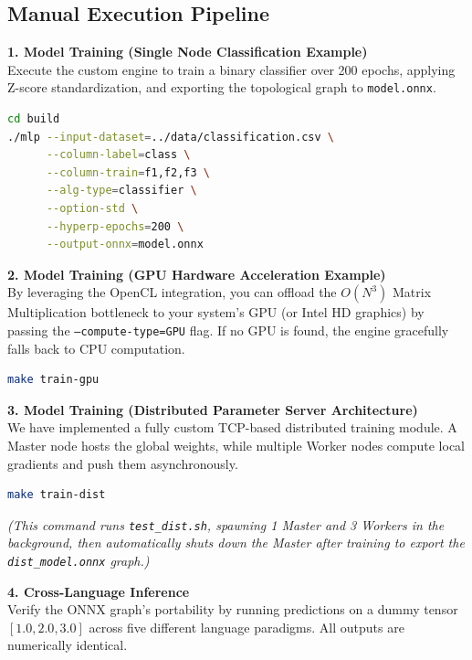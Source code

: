 \documentclass[11pt, a4paper]{article}
\begin{document}
\subsection{Manual Execution Pipeline}

\textbf{1. Model Training (Single Node Classification Example)}\\
Execute the custom engine to train a binary classifier over 200 epochs, applying Z-score standardization, and exporting the topological graph to \texttt{model.onnx}.
\begin{lstlisting}[language=bash]
cd build
./mlp --input-dataset=../data/classification.csv \
      --column-label=class \
      --column-train=f1,f2,f3 \
      --alg-type=classifier \
      --option-std \
      --hyperp-epochs=200 \
      --output-onnx=model.onnx
\end{lstlisting}

\textbf{2. Model Training (GPU Hardware Acceleration Example)}\\
By leveraging the OpenCL integration, you can offload the $O(N^3)$ Matrix Multiplication bottleneck to your system's GPU (or Intel HD graphics) by passing the \texttt{--compute-type=GPU} flag. If no GPU is found, the engine gracefully falls back to CPU computation.
\begin{lstlisting}[language=bash]
make train-gpu
\end{lstlisting}

\textbf{3. Model Training (Distributed Parameter Server Architecture)}\\
We have implemented a fully custom TCP-based distributed training module. A Master node hosts the global weights, while multiple Worker nodes compute local gradients and push them asynchronously. 
\begin{lstlisting}[language=bash]
make train-dist
\end{lstlisting}
\textit{(This command runs \texttt{test\_dist.sh}, spawning 1 Master and 3 Workers in the background, then automatically shuts down the Master after training to export the \texttt{dist\_model.onnx} graph.)}

\textbf{4. Cross-Language Inference}\\
Verify the ONNX graph's portability by running predictions on a dummy tensor $[1.0, 2.0, 3.0]$ across five different language paradigms. All outputs are numerically identical.
\end{document}
